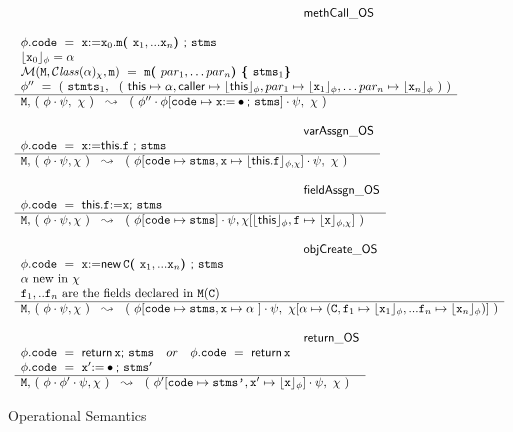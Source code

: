 \begin{figure*}
$\begin{array}{l}
\inferenceruleNN {methCall\_OS} { 
\\
\phi.\prg{code}\ =\ \x {\kw{:= }} \x_0.\m \lp \x_1, ... \x_n \rp \semi \prg{stms}
\\ 
\interp{\x_0}{\phi} = \alpha 
\\
\Meths {} {\ClassOf {\alpha} {\chi}} {\m} \  =  \ \m\lp par_1, \ldots par_n \rp \lb \prg{stms}_1   \rb
  \\
 \phi''\ =\  (\  \prg{stmts}_1,\ \ (\ \this \mapsto \alpha, \caller \mapsto  \interp{\this}{\phi}, par_1 \mapsto  \interp{\x_1}{\phi}, \ldots par_n \mapsto  \interp{\x_n}{\phi}\ ) \ )
}
{
 \M,\, (\ \phi\cdot\psi,\ \chi\ )\ \ \leadsto\  \ (\ \phi''\cdot\phi[\prg{code}\mapsto\x  \kw{:=} \bullet \semi \prg{stms}] \cdot\psi,\ \chi\ ) 
}

\\ \\
\inferenceruleNN {varAssgn\_OS} {
 \phi.\prg{code} \ = \ \x  {\kw{:= }}   \this.\f \ \semi \prg{stms}
}
{
 \M,\,  (\ \phi\cdot\psi, \chi\ )\ \ \leadsto\  \ (\ \phi[ \prg{code} \mapsto \prg{stms}, \x\mapsto \interp{\this.\f}{\phi,\chi}] \cdot\psi,\ \chi\  )
}
\\
\\
\inferenceruleNN{fieldAssgn\_OS} {
 \phi.\prg{code}\ =\  \this.\f  \kw{:=} \x  \semi \prg{stms}
}
{
 \M,\,  (\ \phi\cdot\psi, \chi\  )\ \ \leadsto\  \ (\ \phi[\prg{code}\mapsto  \prg{stms} ] \cdot\psi, \chi[\interp{\this}{\phi},\f \mapsto \interp{\x}{\phi,\chi}]\  ) 
}
\\
\\
\inferenceruleNN {objCreate\_OS} {
 \phi.\prg{code}\ =\  \x  \kw{:=} \kw{new }\, \c \lp \x_1, ... \x_n \rp  \semi \prg{stms}
 \\
 \alpha\ \mbox{new in}\ \chi
 \\
\f_1, .. \f_n\ \mbox{are the fields declared in } \M(\c)
}
{
 \M,\,  (\ \phi\cdot\psi, \chi\ )\ \ \leadsto\  \ (\ \phi[\prg{code}\mapsto  \prg{stms},\x \mapsto \alpha\ ] \cdot\psi, \ \chi[\alpha \mapsto (\c,\f_1 \mapsto \interp{\x_1}{\phi},  ... \f_n \mapsto \interp{\x_n}{\phi}  ) ]\ ) 
}
\\
\\
\inferenceruleNN {return\_OS} {
 \phi.\prg{code}\ =\   {\kw {return }}\, \x  \semi \prg{stms}\ \  \ or\  \ \  \phi.\prg{code}\ =\   {\kw{return}}\, \x 
 \\
\phi.\prg{code}\ =\  \x' \kw{:=} \bullet  \semi \prg{stms}'
}
{
 \M,\,  (\ \phi\cdot\phi'\cdot\psi, \chi\ )\ \ \leadsto\  \ (\ \phi'[\prg{code}\mapsto  \prg{stms'},\x' \mapsto \interp{\x}{\phi}] \cdot\psi, \ \chi \ ) 
}
\end{array}
$
\caption{Operational Semantics}
\label{fig:Execution}
\end{figure*}



